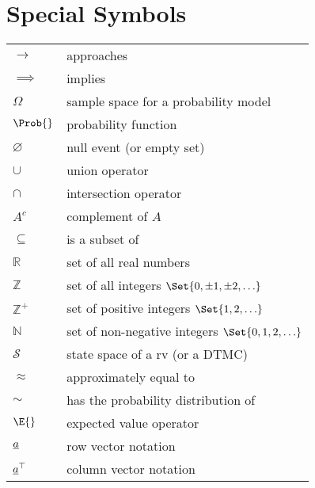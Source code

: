 \section{Special Symbols}
\begin{tabular}{ll}
    $ \to $              & approaches                                              \\
    $ \implies $         & implies                                                 \\
    $ \Omega $           & sample space for a probability model                    \\
    $ \Prob{} $          & probability function                                    \\
    $ \varnothing $      & null event (or empty set)                               \\
    $ \cup $             & union operator                                          \\
    $ \cap $             & intersection operator                                   \\
    $ A^c $              & complement of $ A $                                     \\
    $ \subseteq $        & is a subset of                                          \\
    $ \mathbb{R} $       & set of all real numbers                                 \\
    $ \mathbb{Z} $       & set of all integers $ \Set{0,\pm 1,\pm 2,\ldots} $      \\
    $ \mathbb{Z}^+ $     & set of positive integers $ \Set{1,2,\ldots} $           \\
    $ \mathbb{N} $       & set of non-negative integers $ \Set{0,1,2,\ldots} $     \\
    $ \mathcal{S} $      & state space of a rv (or a DTMC)                         \\
    $ \approx $          & approximately equal to                                  \\
    $ \sim $             & has the probability distribution of                     \\
    $ \E{} $             & expected value operator                                 \\
    $ \underline{a} $       & row vector notation                                     \\
    $ \underline{a}^\top $  & column vector notation                                  \\

\end{tabular}
